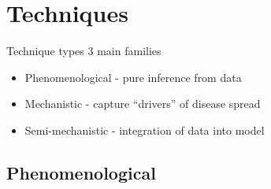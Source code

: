 \documentclass[11pt,compress,aspectratio=1610]{beamer}
\begin{document}
\section{Techniques}

\begin{frame}{Technique types}
3 main families
\begin{itemize}
	\item Phenomenological - pure inference from data
	\item Mechanistic - capture ``drivers'' of disease spread
	\item Semi-mechanistic - integration of data into model
\end{itemize}
\end{frame}


\subsection{Phenomenological}
\end{document}
